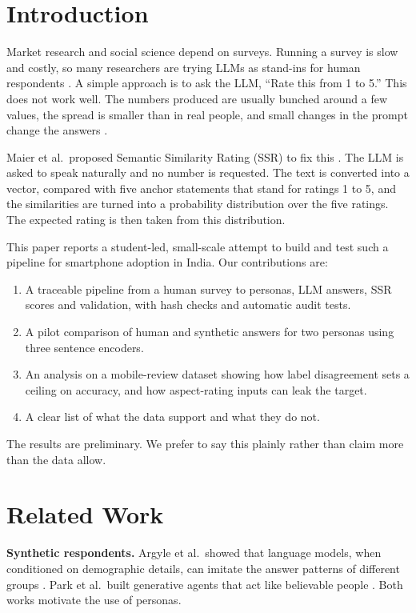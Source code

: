 \documentclass[conference]{IEEEtran}
\begin{document}
\section{Introduction}
Market research and social science depend on surveys. Running a survey is slow and costly, so many researchers are trying LLMs as stand-ins for human respondents \cite{argyle2023,park2023}. A simple approach is to ask the LLM, ``Rate this from 1 to 5.'' This does not work well. The numbers produced are usually bunched around a few values, the spread is smaller than in real people, and small changes in the prompt change the answers \cite{maier2025}.

Maier et al.\ proposed Semantic Similarity Rating (SSR) to fix this \cite{maier2025}. The LLM is asked to speak naturally and no number is requested. The text is converted into a vector, compared with five anchor statements that stand for ratings 1 to 5, and the similarities are turned into a probability distribution over the five ratings. The expected rating is then taken from this distribution.

This paper reports a student-led, small-scale attempt to build and test such a pipeline for smartphone adoption in India. Our contributions are:
\begin{enumerate}
\item A traceable pipeline from a human survey to personas, LLM answers, SSR scores and validation, with hash checks and automatic audit tests.
\item A pilot comparison of human and synthetic answers for two personas using three sentence encoders.
\item An analysis on a mobile-review dataset showing how label disagreement sets a ceiling on accuracy, and how aspect-rating inputs can leak the target.
\item A clear list of what the data support and what they do not.
\end{enumerate}

The results are preliminary. We prefer to say this plainly rather than claim more than the data allow.

\section{Related Work}
\textbf{Synthetic respondents.} Argyle et al.\ showed that language models, when conditioned on demographic details, can imitate the answer patterns of different groups \cite{argyle2023}. Park et al.\ built generative agents that act like believable people \cite{park2023}. Both works motivate the use of personas.
\end{document}
